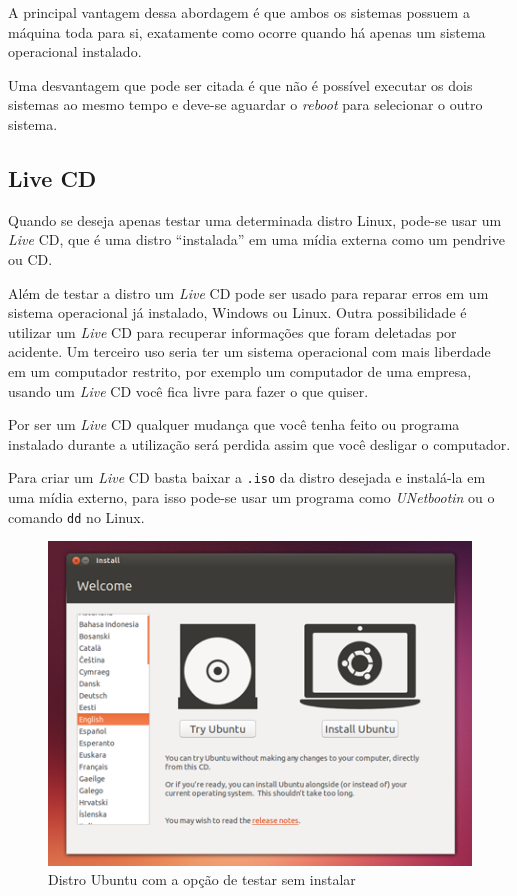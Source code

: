 \documentclass{handout_utfpr}
\begin{document}
A principal vantagem dessa abordagem é que ambos os sistemas possuem a máquina toda para si, exatamente como ocorre quando há apenas um sistema operacional instalado.

Uma desvantagem que pode ser citada é que não é possível executar os dois sistemas ao mesmo tempo e deve-se aguardar o \textit{reboot} para selecionar o outro sistema.


\subsection{Live CD}

Quando se deseja apenas testar uma determinada distro Linux, pode-se usar um \textit{Live} CD, que é uma distro ``instalada'' em uma mídia externa como um pendrive ou CD. 

Além de testar a distro um \textit{Live} CD pode ser usado para reparar erros em um sistema operacional já instalado, Windows ou Linux. Outra possibilidade é utilizar um \textit{Live} CD para recuperar informações que foram deletadas por acidente. Um terceiro uso seria ter um sistema operacional com mais liberdade em um computador restrito, por exemplo um computador de uma empresa, usando um \textit{Live} CD você fica livre para fazer o que quiser.

Por ser um \textit{Live} CD qualquer mudança que você tenha feito ou programa instalado durante a utilização será perdida assim que você desligar o computador.

Para criar um \textit{Live} CD basta baixar a \texttt{.iso} da distro desejada e instalá-la em uma mídia externo, para isso pode-se usar um programa como \emph{UNetbootin} ou o comando \texttt{dd} no Linux.

\begin{figure}[!h]
  \centering
  \includegraphics[scale=.5]{imagens/ubuntu-livecd.png}
  \caption{Distro Ubuntu com a opção de testar sem instalar}
  \label{fig:ubuntu-live}
\end{figure}
\end{document}

